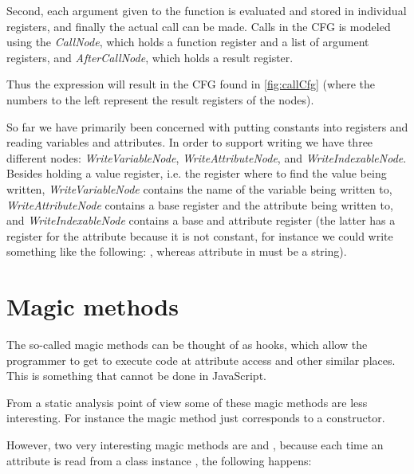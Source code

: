 Second, each argument given to the function is evaluated and stored in individual registers, and finally the actual call can be made. Calls in the CFG is modeled using the \textit{CallNode}, which holds a function register and a list of argument registers, and \textit{AfterCallNode}, which holds a result register.

Thus the expression  will result in the CFG found in \autoref{fig:callCfg} 
(where the numbers to the left represent the result registers of the nodes).

So far we have primarily been concerned with putting constants into registers and reading variables and attributes. In order to support writing we have three different nodes: \textit{WriteVariableNode}, \textit{WriteAttributeNode}, and \textit{WriteIndexableNode}. Besides holding a value register, i.e. the register where to find the value being written, \textit{WriteVariableNode} contains the name of the variable being written to, \textit{WriteAttributeNode} contains a base register and the attribute being written to, and \textit{WriteIndexableNode} contains a base and attribute register (the latter has a register for the attribute because it is not constant, for instance we could write something like the following: , whereas attribute in  must be a string).



\section{Magic methods}
The so-called magic methods can be thought of as hooks, which allow the programmer to get to execute code at attribute access and other similar places. This is something that cannot be done in JavaScript.

From a static analysis point of view some of these magic methods are less interesting. For instance the magic method  just corresponds to a constructor.

\begin{sloppypar}
However, two very interesting magic methods are  and , because each time an attribute  is read from a class instance , the following happens:
\end{sloppypar}

